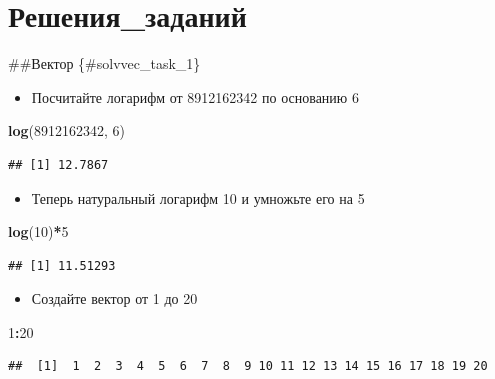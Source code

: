 \documentclass[]{book}
\newenvironment{Shaded}{\begin{snugshade}}{\end{snugshade}}
\newcommand{\DecValTok}[1]{\textcolor[rgb]{0.00,0.00,0.81}{#1}}
\newcommand{\KeywordTok}[1]{\textcolor[rgb]{0.13,0.29,0.53}{\textbf{#1}}}
\newcommand{\NormalTok}[1]{#1}
\newcommand{\OperatorTok}[1]{\textcolor[rgb]{0.81,0.36,0.00}{\textbf{#1}}}
\providecommand{\tightlist}{%
  \setlength{\itemsep}{0pt}\setlength{\parskip}{0pt}}
\begin{document}
\hypertarget{solutions}{%
\chapter{Решения\_заданий}\label{solutions}}

\#\#Вектор \{\#solvvec\_task\_1\}

\begin{itemize}
\tightlist
\item
  Посчитайте логарифм от 8912162342 по основанию 6
\end{itemize}

\begin{Shaded}
\begin{Highlighting}[]
\KeywordTok{log}\NormalTok{(}\DecValTok{8912162342}\NormalTok{, }\DecValTok{6}\NormalTok{)}
\end{Highlighting}
\end{Shaded}

\begin{verbatim}
## [1] 12.7867
\end{verbatim}

\begin{itemize}
\tightlist
\item
  Теперь натуральный логарифм 10 и умножьте его на 5
\end{itemize}

\begin{Shaded}
\begin{Highlighting}[]
\KeywordTok{log}\NormalTok{(}\DecValTok{10}\NormalTok{)}\OperatorTok{*}\DecValTok{5}
\end{Highlighting}
\end{Shaded}

\begin{verbatim}
## [1] 11.51293
\end{verbatim}

\begin{itemize}
\tightlist
\item
  Создайте вектор от 1 до 20
\end{itemize}

\begin{Shaded}
\begin{Highlighting}[]
\DecValTok{1}\OperatorTok{:}\DecValTok{20}
\end{Highlighting}
\end{Shaded}

\begin{verbatim}
##  [1]  1  2  3  4  5  6  7  8  9 10 11 12 13 14 15 16 17 18 19 20
\end{verbatim}
\end{document}

